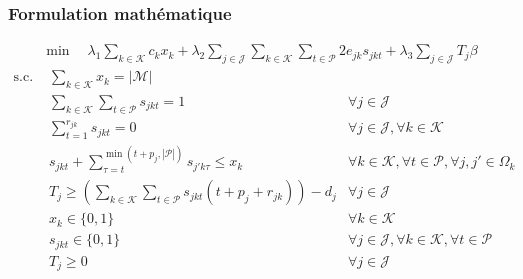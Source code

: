 \subsubsection{Formulation mathématique}

\begin{align}
    \label{eq:time_objective} \min \quad \lambda_{1} \sum_{k \in \mathcal{K}} c_{k} x_{k} + \lambda_{2} \sum_{j \in \mathcal{J}} \sum_{k \in \mathcal{K}} \sum_{t \in \mathcal{P}} 2 e_{jk} s_{jkt} + \lambda_{3} \sum_{j \in \mathcal{J}} T_{j} \beta
\end{align}
\begin{align}
    \text{s.c.~}
    & \label{eq:time_installation} \sum_{k \in \mathcal{K}} x_{k} = |\mathcal{M}| \\
    & \label{eq:time_execution} \sum_{k \in \mathcal{K}} \sum_{t \in \mathcal{P}} s_{jkt} = 1 & \forall j \in \mathcal{J} \\
    & \label{eq:time_start} \sum_{t=1}^{r_{jk}} s_{jkt} = 0 & \forall j \in \mathcal{J}, \forall k \in \mathcal{K} \\
    & \label{eq:time_scheduling} s_{jkt} + \sum_{\tau=t}^{\min(t+p_{j}, |\mathcal{P}|)} s_{j'k\tau} \leq x_{k} & \forall k \in \mathcal{K}, \forall t \in \mathcal{P}, \forall j, j' \in \Omega_{k} \\
    & \label{eq:time_retards} T_{j} \geq \left( \sum_{k \in \mathcal{K}} \sum_{t \in \mathcal{P}} s_{jkt} (t + p_{j} + r_{jk}) \right) - d_{j} & \forall j \in \mathcal{J} \\
    & \label{eq:time_domain_installation} x_{k} \in \{0, 1\} & \forall k \in \mathcal{K} \\
    & \label{eq:time_domain_scheduling} s_{jkt} \in \{0, 1\} & \forall j \in \mathcal{J}, \forall k \in \mathcal{K}, \forall t \in \mathcal{P} \\
    & \label{eq:time_domain_retards} T_{j} \geq 0 & \forall j \in \mathcal{J}
\end{align}
